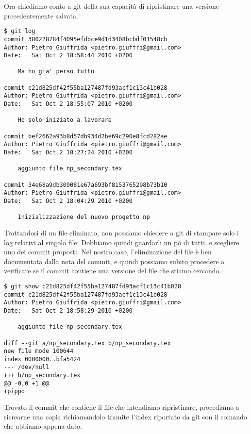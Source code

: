 \documentclass{article}
\begin{document}
Ora chiediamo conto a git della sua capacità di ripristinare una versione
precedentemente salvata.

\begin{framed}
\begin{lstlisting}
$ git log
commit 380228784f4095efdbce9d1d3408bcbdf01548cb
Author: Pietro Giuffrida <pietro.giuffri@gmail.com>
Date:   Sat Oct 2 18:58:44 2010 +0200

    Ma ho gia' perso tutto

commit c21d825df42f55ba127487fd93acf1c13c41b028
Author: Pietro Giuffrida <pietro.giuffri@gmail.com>
Date:   Sat Oct 2 18:55:07 2010 +0200

    Ho solo iniziato a lavorare

commit bef2662a93b8d57db934d2be69c290e8fcd282ae
Author: Pietro Giuffrida <pietro.giuffri@gmail.com>
Date:   Sat Oct 2 18:27:24 2010 +0200

    aggiunto file np_secondary.tex

commit 34e68a9db309081e67a693bf8153765298b73b10
Author: Pietro Giuffrida <pietro.giuffri@gmail.com>
Date:   Sat Oct 2 18:04:29 2010 +0200

    Inizializzazione del nuovo progetto np
\end{lstlisting}
\end{framed}

Trattandosi di un file eliminato, non possiamo chiedere a git di stampare solo i
log relativi al singolo file. Dobbiamo quindi guardarli un pò di tutti, e
scegliere uno dei commit proposti. Nel nostro caso, l'eliminazione del file è
ben documentata dalla nota del commit, e quindi possiamo subito procedere a
verificare se il commit contiene una versione del file che stiamo cercando.

\begin{framed}
\begin{lstlisting}
$ git show c21d825df42f55ba127487fd93acf1c13c41b028
commit c21d825df42f55ba127487fd93acf1c13c41b028
Author: Pietro Giuffrida <pietro.giuffri@gmail.com>
Date:   Sat Oct 2 18:58:29 2010 +0200

    aggiunto file np_secondary.tex

diff --git a/np_secondary.tex b/np_secondary.tex
new file mode 100644
index 0000000..bfa5424
--- /dev/null
+++ b/np_secondary.tex
@@ -0,0 +1 @@
+pippo
\end{lstlisting}
\end{framed}

Trovato il commit che contiene il file che intendiamo ripristinare, procediamo
a ricrearne una copia richiamandolo tramite l'index riportato da git con il
comando che abbiamo appena dato.
\end{document}
